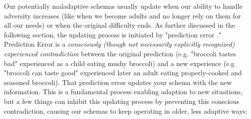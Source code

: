 \documentclass[12pt,letterpaper]{book}
\begin{document}
Our potentially maladaptive schemas usually update when our ability to handle adversity increases (like when we become adults and no longer rely on them for all our needs) or when the original difficulty ends. As further discussed in the following section, the updating process is initiated by "prediction error \cite{eckerUnlocking}." Prediction Error is a \textit{consciously (though not necessarily explicitly recognized) experienced contradiction} between the original prediction (e.g. "broccoli tastes bad" experienced as a child eating mushy broccoli) and a new experience (e.g "broccoli can taste good" experienced later an adult eating properly-cooked and seasoned broccoli). That prediction error updates your schema with the new information. This is a fundamental process enabling adaption to new situations, but a few things can inhibit this updating process by preventing this conscious contradiction, causing our schemas to keep operating in older, less adaptive ways:
\end{document}
